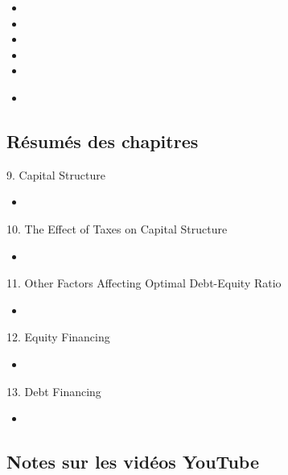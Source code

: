 \begin{ASM_chapter}
\begin{itemize}
	\item	{}
	\item	{}
	\item	{}
	\item	{}
	\item	{}
\end{itemize}
\end{ASM_chapter}

\begin{YTB_vids}
\begin{itemize}
	\item	
\end{itemize}
\end{YTB_vids}

\subsection{Résumés des chapitres}

\begin{CHPT_SUMM_AUTO}[label = {L.-9}]{9. Capital Structure}
	\begin{itemize}
		\item	
	\end{itemize}
\end{CHPT_SUMM_AUTO}

\begin{CHPT_SUMM_AUTO}[label = {L.-10}]{10. The Effect of Taxes on Capital Structure}
	\begin{itemize}
		\item	
	\end{itemize}
\end{CHPT_SUMM_AUTO}

\begin{CHPT_SUMM_AUTO}[label = {L.-11}]{11. Other Factors Affecting Optimal Debt-Equity Ratio}
	\begin{itemize}
		\item	
	\end{itemize}
\end{CHPT_SUMM_AUTO}

\begin{CHPT_SUMM_AUTO}[label = {L.-12}]{12. Equity Financing}
	\begin{itemize}
		\item	
	\end{itemize}
\end{CHPT_SUMM_AUTO}

\begin{CHPT_SUMM_AUTO}[label = {L.-13}]{13. Debt Financing}
	\begin{itemize}
		\item	
	\end{itemize}
\end{CHPT_SUMM_AUTO}

\subsection{Notes sur les vidéos YouTube}

